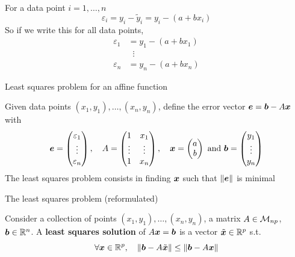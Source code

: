 \documentclass[aspectratio=169]{beamer}\usepackage[]{graphicx}\usepackage[]{xcolor}
\begin{document}
\begin{frame}
	For a data point $i=1,\ldots,n$
	\[
	\varepsilon_i = y_i-\tilde y_i = y_i - (a+bx_i)
	\]
	So if we write this for all data points,
	\begin{align*}
	\varepsilon_1 &= y_1 - (a+bx_1) \\
	&\;\;\vdots \\
	\varepsilon_n &= y_n - (a+bx_n)
	\end{align*}
\end{frame}

\begin{frame}{Least squares problem for an affine function}
\begin{importantdefinition}
\label{def:least_squares_affine}
Given data points $(x_1,y_1),\ldots,(x_n,y_n)$, define the error vector $\bm{e} = \bm{b}-A\bm{x}$ with
\[
\bm{e} = \begin{pmatrix}
\varepsilon_1\\ \vdots\\ \varepsilon_n
\end{pmatrix}, \quad
A=\begin{pmatrix}
1 & x_1 \\ \vdots & \vdots \\ 1 & x_n
\end{pmatrix}, \quad
\bm{x} = \begin{pmatrix}
a\\b
\end{pmatrix}\textrm{ and }
\bm{b} = \begin{pmatrix}
y_1\\ \vdots\\ y_n
\end{pmatrix}
\]
The least squares problem consists in finding $\bm{x}$ such that $\|\bm{e}\|$ is minimal
\end{importantdefinition}
\end{frame}

\begin{frame}{The least squares problem (reformulated)}
\begin{importantdefinition}
Consider a collection of points $(x_1,y_1),\ldots,(x_n,y_n)$, a matrix $A\in\mathcal{M}_{np}$, $\bm{b}\in\mathbb{R}^n$. A \textbf{least squares solution} of $A\bm{x}=\bm{b}$ is a vector $\tilde {\bm{x}}\in\mathbb{R}^p$ s.t.
\[
\forall \bm{x}\in\mathbb{R}^p,\quad \|\bm{b}-A\tilde{\bm{x}}\|\leq \|\bm{b}-A\bm{x}\|
\]
\end{importantdefinition}
\end{frame}
\end{document}

